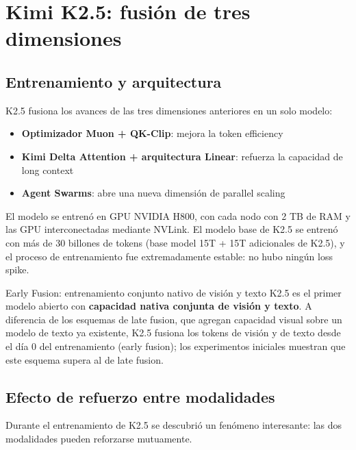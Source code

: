 \section{Kimi K2.5: fusión de tres dimensiones}

\subsection{Entrenamiento y arquitectura}

K2.5 fusiona los avances de las tres dimensiones anteriores en un solo modelo:
\begin{itemize}
    \item \textbf{Optimizador Muon + QK-Clip}: mejora la token efficiency
    \item \textbf{Kimi Delta Attention + arquitectura Linear}: refuerza la capacidad de long context
    \item \textbf{Agent Swarms}: abre una nueva dimensión de parallel scaling
\end{itemize}

El modelo se entrenó en GPU NVIDIA H800, con cada nodo con 2 TB de RAM y las GPU interconectadas mediante NVLink. El modelo base de K2.5 se entrenó con más de 30 billones de tokens (base model 15T + 15T adicionales de K2.5), y el proceso de entrenamiento fue extremadamente estable: no hubo ningún loss spike.

\begin{importantbox}{Early Fusion: entrenamiento conjunto nativo de visión y texto}
K2.5 es el primer modelo abierto con \textbf{capacidad nativa conjunta de visión y texto}. A diferencia de los esquemas de late fusion, que agregan capacidad visual sobre un modelo de texto ya existente, K2.5 fusiona los tokens de visión y de texto desde el día 0 del entrenamiento (early fusion); los experimentos iniciales muestran que este esquema supera al de late fusion.
\end{importantbox}

\subsection{Efecto de refuerzo entre modalidades}

Durante el entrenamiento de K2.5 se descubrió un fenómeno interesante: las dos modalidades pueden reforzarse mutuamente.

